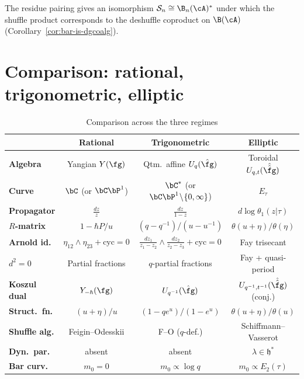 \begin{remark}\label{rem:shuffle-bar}
The residue pairing gives an isomorphism $\mathcal{S}_n \cong \B_n(\cA)^*$ under which the shuffle product corresponds to the deshuffle coproduct on $\B(\cA)$ (Corollary~\ref{cor:bar-is-dgcoalg}).
\end{remark}


\section{Comparison: rational, trigonometric, elliptic}
\label{sec:rat-trig-ell-comparison}

\begin{table}[ht]
\centering
\caption{Comparison across the three regimes}
\label{tab:rat-trig-ell}
\renewcommand{\arraystretch}{1.35}
{\footnotesize
\begin{tabular}{|l|c|c|c|}
\hline
& \textbf{Rational} & \textbf{Trigonometric} & \textbf{Elliptic} \\
\hline
\textbf{Algebra}
& Yangian $Y(\fg)$
& Qtm.\ affine $U_q(\hat{\fg})$
& Toroidal $U_{q,t}(\hat{\hat{\fg}})$ \\
\hline
\textbf{Curve}
& $\bC$ (or $\bC\bP^1$)
& $\bC^*$ (or $\bC\bP^1 \!\setminus\! \{0,\infty\}$)
& $E_\tau$ \\
\hline
\textbf{Propagator}
& $\frac{dz}{z}$
& $\frac{dz}{1 - z}$
& $d\log\theta_1(z|\tau)$ \\
\hline
\textbf{$R$-matrix}
& $1 - \hbar P/u$
& $(q{-}q^{-1})/(u{-}u^{-1})$
& $\theta(u{+}\eta)/\theta(\eta)$ \\
\hline
\textbf{Arnold id.}
& $\eta_{12}\!\wedge\!\eta_{23} + \text{cyc} = 0$
& $\frac{dz_1}{z_1{-}z_2}\!\wedge\!\frac{dz_2}{z_2{-}z_3} {+} \text{cyc} = 0$
& Fay trisecant \\
\hline
\textbf{$d^2\!=\!0$}
& Partial fractions
& $q$-partial fractions
& Fay + quasi-period \\
\hline
\textbf{Koszul dual}
& $Y_{-\hbar}(\fg)$
& $U_{q^{-1}}(\hat{\fg})$
& $U_{q^{-1},t^{-1}}(\hat{\hat{\fg}})$ (conj.) \\
\hline
\textbf{Struct.\ fn.}
& $(u{+}\eta)/u$
& $(1{-}qe^u)/(1{-}e^u)$
& $\theta(u{+}\eta)/\theta(u)$ \\
\hline
\textbf{Shuffle alg.}
& Feigin--Odesskii
& F--O ($q$-def.)
& Schiffmann--Vasserot \\
\hline
\textbf{Dyn.\ par.}
& absent
& absent
& $\lambda \in \mathfrak{h}^*$ \\
\hline
\textbf{Bar curv.}
& $m_0 = 0$
& $m_0 \propto \log q$
& $m_0 \propto E_2(\tau)$ \\
\hline
\end{tabular}
}
\end{table}

